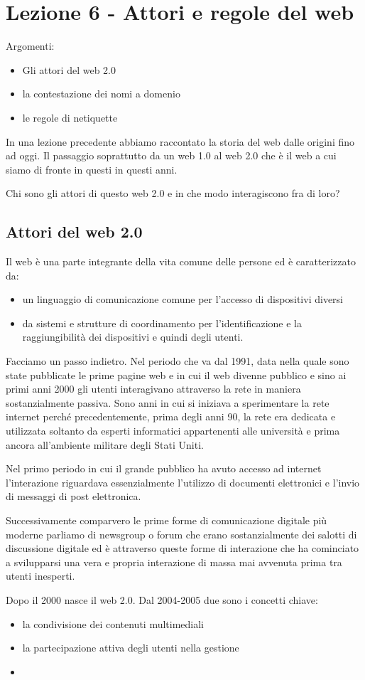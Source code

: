 \chapter{Lezione 6 - Attori e regole del web}

Argomenti:

\begin{itemize}
    \item Gli attori del web 2.0
    \item la contestazione dei nomi a domenio
    \item le regole di netiquette
\end{itemize}
In una lezione precedente abbiamo raccontato la storia del web dalle origini fino ad oggi. Il passaggio soprattutto da un web 1.0 al web 2.0 che è il web a cui siamo di fronte in questi in questi anni.\par
Chi sono gli attori di questo web 2.0 e in che modo interagiscono fra di loro?
\section{Attori del web 2.0}
Il web è una parte integrante della vita comune delle persone ed è caratterizzato da:
\begin{itemize}
    \item un linguaggio di comunicazione comune per l'accesso di dispositivi diversi
    \item da sistemi e strutture di coordinamento per l'identificazione e la raggiungibilità dei dispositivi e quindi degli utenti. 
\end{itemize}

Facciamo un passo indietro. Nel periodo che va dal 1991, data nella quale sono state pubblicate le prime pagine web e in cui il web divenne pubblico e sino ai primi anni 2000 gli utenti interagivano attraverso la rete in maniera sostanzialmente passiva. Sono anni in cui si iniziava a sperimentare la rete internet perché precedentemente, prima degli anni 90, la rete era dedicata e utilizzata soltanto da esperti informatici appartenenti alle università e prima ancora all'ambiente militare degli Stati Uniti. \par
Nel primo periodo in cui il grande pubblico ha avuto accesso ad internet l'interazione riguardava essenzialmente l'utilizzo di documenti elettronici e l'invio di messaggi di post elettronica.\par Successivamente comparvero le prime forme di comunicazione digitale più moderne parliamo di newsgroup o forum che erano sostanzialmente dei salotti di discussione digitale ed è attraverso queste forme di interazione che ha cominciato a svilupparsi una vera e propria interazione di massa mai avvenuta prima tra utenti inesperti.\par
Dopo il 2000 nasce il web 2.0.
Dal 2004-2005 due sono i concetti chiave:
\begin{itemize}
    \item la condivisione dei contenuti multimediali 
    \item la partecipazione attiva degli utenti nella gestione 
    \item 
\end{itemize}

